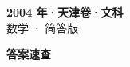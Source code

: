 \documentclass[zihao=-4, a4paper]{ctexart}
\begin{document}
\begin{center}
  {\Large\bfseries 2004 年·天津卷·文科}\\[4pt]
  {\large 数学 · 简答版}
\end{center}
\medskip
{}

\clearpage
{}
\begin{center}{\Large\bfseries 答案速查}\end{center}
\medskip

\end{document}
